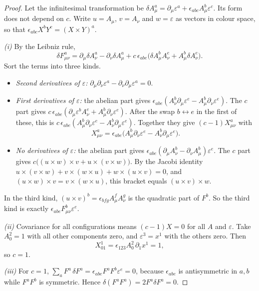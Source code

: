 \begin{proof}
Let the infinitesimal transformation be $\delta A^a_\mu=\partial_\mu\varepsilon^a+\epsilon_{abc}A^b_\mu\varepsilon^c$. Its form does not depend on $c$. Write $u=A_\mu$, $v=A_\nu$ and $w=\varepsilon$ as vectors in colour space, so that $\epsilon_{abc}X^bY^c=(X\times Y)^a$.

\emph{(i)} By the Leibniz rule,
\[
\delta F^a_{\mu\nu}=\partial_\mu\delta A^a_\nu-\partial_\nu\delta A^a_\mu+c\,\epsilon_{abe}\bigl(\delta A^b_\mu A^e_\nu+A^b_\mu\delta A^e_\nu\bigr).
\]
Sort the terms into three kinds.
\begin{itemize}[nosep]
\item \emph{Second derivatives of $\varepsilon$:} $\partial_\mu\partial_\nu\varepsilon^a-\partial_\nu\partial_\mu\varepsilon^a=0$.
\item \emph{First derivatives of $\varepsilon$:} the abelian part gives $\epsilon_{abe}(A^b_\nu\partial_\mu\varepsilon^e-A^b_\mu\partial_\nu\varepsilon^e)$. The $c$ part gives $c\,\epsilon_{abe}(\partial_\mu\varepsilon^bA^e_\nu+A^b_\mu\partial_\nu\varepsilon^e)$. After the swap $b\leftrightarrow e$ in the first of these, this is $c\,\epsilon_{abe}(A^b_\mu\partial_\nu\varepsilon^e-A^b_\nu\partial_\mu\varepsilon^e)$. Together they give $(c-1)X^a_{\mu\nu}$ with
\[
X^a_{\mu\nu}=\epsilon_{abe}\bigl(A^b_\mu\partial_\nu\varepsilon^e-A^b_\nu\partial_\mu\varepsilon^e\bigr).
\]
\item \emph{No derivatives of $\varepsilon$:} the abelian part gives $\epsilon_{abe}(\partial_\mu A^b_\nu-\partial_\nu A^b_\mu)\varepsilon^e$. The $c$ part gives $c\bigl((u\times w)\times v+u\times(v\times w)\bigr)$. By the Jacobi identity $u\times(v\times w)+v\times(w\times u)+w\times(u\times v)=0$, and $(u\times w)\times v=v\times(w\times u)$, this bracket equals $(u\times v)\times w$.
\end{itemize}
In the third kind, $(u\times v)^b=\epsilon_{bfg}A^f_\mu A^g_\nu$ is the quadratic part of $F^b$. So the third kind is exactly $\epsilon_{abe}F^b_{\mu\nu}\varepsilon^e$.

\emph{(ii)} Covariance for all configurations means $(c-1)X=0$ for all $A$ and $\varepsilon$. Take $A^2_0=1$ with all other components zero, and $\varepsilon^3=x^1$ with the others zero. Then
\[
X^1_{01}=\epsilon_{123}A^2_0\,\partial_1x^1=1 ,
\]
so $c=1$.

\emph{(iii)} For $c=1$, $\sum_aF^a\,\delta F^a=\epsilon_{abe}F^aF^b\varepsilon^e=0$, because $\epsilon_{abe}$ is antisymmetric in $a,b$ while $F^aF^b$ is symmetric. Hence $\delta(F^aF^a)=2F^a\delta F^a=0$.


\end{proof}

